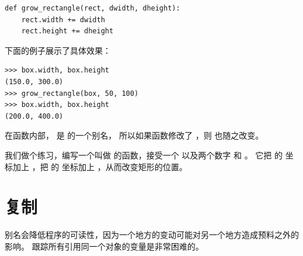 \begin{lstlisting}
def grow_rectangle(rect, dwidth, dheight):
    rect.width += dwidth
    rect.height += dheight
\end{lstlisting}

%

下面的例子展示了具体效果：

\begin{lstlisting}
>>> box.width, box.height
(150.0, 300.0)
>>> grow_rectangle(box, 50, 100)
>>> box.width, box.height
(200.0, 400.0)
\end{lstlisting}

%

在函数内部，  是  的一个别名，
所以如果函数修改了  ，则  也随之改变。


我们做个练习，编写一个叫做  的函数，接受一个  以及两个数字  和 。  它把  的  坐标加上 ，把  的  坐标加上  ，从而改变矩形的位置。

\section{复制}
\label{copying}


别名会降低程序的可读性，因为一个地方的变动可能对另一个地方造成预料之外的影响。
跟踪所有引用同一个对象的变量是非常困难的。
  
  



